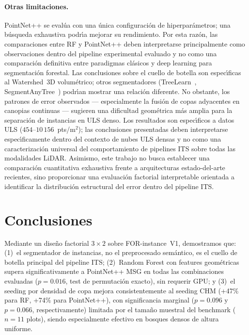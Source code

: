 \documentclass[runningheads]{llncs}
\begin{document}
\paragraph{Otras limitaciones.}
PointNet++ se eval\'ua con una \'unica configuraci\'on de hiperpar\'ametros; una b\'usqueda exhaustiva podr\'\i{}a mejorar su rendimiento. Por esta raz\'on, las comparaciones entre RF y PointNet++ deben interpretarse principalmente como observaciones dentro del pipeline experimental evaluado y no como una comparaci\'on definitiva entre paradigmas cl\'asicos y deep learning para segmentaci\'on forestal. Las conclusiones sobre el cuello de botella son espec\'\i{}ficas al Watershed~3D volum\'etrico; otros segmentadores (TreeLearn~\cite{henrich2024}, SegmentAnyTree~\cite{wielgosz2024}) podr\'\i{}an mostrar una relaci\'on diferente. No obstante, los patrones de error observados --- especialmente la fusi\'on de copas adyacentes en canopias continuas --- sugieren una dificultad geom\'etrica m\'as amplia para la separaci\'on de instancias en ULS denso. Los resultados son espec\'\i{}ficos a datos ULS ($454$--$10\,156$~pts/m$^2$); las conclusiones presentadas deben interpretarse espec\'\i{}ficamente dentro del contexto de nubes ULS densas y no como una caracterizaci\'on universal del comportamiento de pipelines ITS sobre todas las modalidades LiDAR. Asimismo, este trabajo no busca establecer una comparaci\'on cuantitativa exhaustiva frente a arquitecturas estado-del-arte recientes, sino proporcionar una evaluaci\'on factorial interpretable orientada a identificar la distribuci\'on estructural del error dentro del pipeline ITS.

\section{Conclusiones}\label{sec:conclusions}

Mediante un dise\~no factorial $3 \times 2$ sobre FOR-instance~V1, demostramos que: (1)~el segmentador de instancias, no el preprocesado sem\'antico, es el cuello de botella principal del pipeline ITS; (2)~Random Forest con features geom\'etricas supera significativamente a PointNet++ MSG en todas las combinaciones evaluadas ($p=0.016$, test de permutaci\'on exacto), sin requerir GPU; y (3)~el seeding por densidad de copa mejora consistentemente al seeding CHM (+47\% para RF, +74\% para PointNet++), con significancia marginal ($p=0.096$ y $p=0.066$, respectivamente) limitada por el tama\~no muestral del benchmark ($n=11$ plots), siendo especialmente efectivo en bosques densos de altura uniforme.
\end{document}
